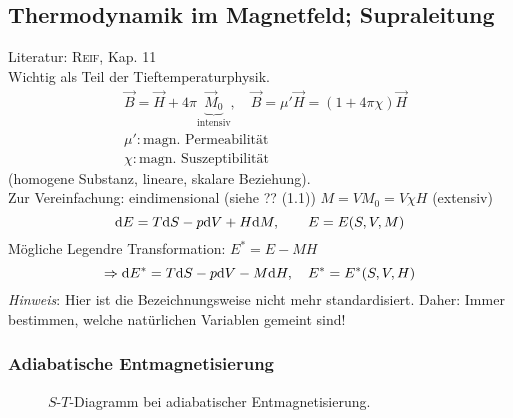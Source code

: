 \subsection{Thermodynamik im Magnetfeld; Supraleitung}
Literatur: \textsc{Reif}, Kap. 11\\
Wichtig als Teil der Tieftemperaturphysik.
\begin{equation}
    \begin{split}
        & \vec{B} = \vec{H} + 4 \pi \underbrace{\vec{M}_0}_{\text{intensiv}}, \quad \vec{B} = \mu' \vec{H} = (1 + 4 \pi \chi) \vec{H} \\
        & \mu': \text{magn. Permeabilität} \\
        & \chi: \text{magn. Suszeptibilität}
    \end{split}
\end{equation}
(homogene Substanz, lineare, skalare Beziehung). \\
Zur Vereinfachung: eindimensional (siehe ?? (1.1)) $M = V M_0 = V \chi H$ (extensiv)
\begin{equation}
    \mathrm{d} E = T \mathrm{d} S - p \mathrm{d} V + H \mathrm{d} M, \qquad E = E(S, V, M)
\end{equation}
Mögliche Legendre Transformation: $E^* = E - M H$
\begin{equation}
    \Rightarrow \mathrm{d} E^* = T \mathrm{d} S - p \mathrm{d} V - M \mathrm{d} H, \quad E^* =  E^*(S, V, H)
\end{equation}
\emph{Hinweis}: Hier ist die Bezeichnungsweise nicht mehr standardisiert. Daher: Immer bestimmen, welche natürlichen Variablen gemeint sind!
\subsubsection{Adiabatische Entmagnetisierung}

\begin{figure}[H]
        \centering
        \def\svgwidth{0.9\textwidth}
        
        \caption{$S$-$T$-Diagramm bei adiabatischer Entmagnetisierung.}
        \label{img:paramag_Tto0_2}
\end{figure}

